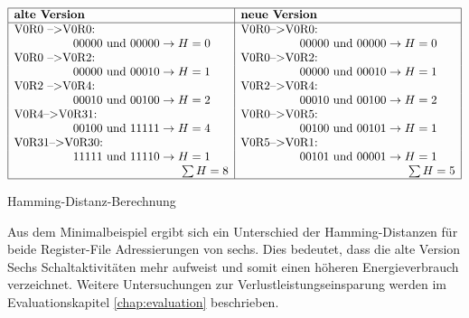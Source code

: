 \begin{table}[H]
	\centering
	$ \begin{array}{|l|l|}
	\hline
	\textbf{alte Version} & \textbf{neue Version} \\
	\hline
	\text{V0R0 -->V0R0: }&\text{V0R0-->V0R0: }\\ 
	\hspace{50pt} 00000 \text{ und } 00000 \rightarrow H= 0 &\hspace{50pt} 00000 \text{ und } 00000 \rightarrow H= 0\\
	\text{V0R0 -->V0R2: } &\text{V0R0-->V0R2: }\\
	\hspace{50pt} 00000 \text{ und } 00010 \rightarrow H= 1 &\hspace{50pt} 00000 \text{ und } 00010 \rightarrow H= 1 \\
	\text{V0R2 -->V0R4: } &\text{V0R2-->V0R4: }\\
	\hspace{50pt} 00010 \text{ und } 00100 \rightarrow H= 2 &\hspace{50pt} 00010 \text{ und } 00100 \rightarrow H= 2 \\
	\text{V0R4-->V0R31: } &\text{V0R0-->V0R5: }\\
	\hspace{50pt} 00100 \text{ und } 11111 \rightarrow H= 4 &\hspace{50pt} 00100 \text{ und } 00101 \rightarrow H= 1 \\
	\text{V0R31-->V0R30: } &\text{V0R5-->V0R1: }\\
	\hspace{50pt} 11111 \text{ und } 11110 \rightarrow H= 1 &\hspace{50pt} 00101 \text{ und } 00001 \rightarrow H= 1 \\
	\hspace{142pt} \sum H=8 &\hspace{142pt}\sum H=5 \\
	\hline
	\end{array} $
	\caption{Hamming-Distanz-Berechnung}
	\label{tab::hamming_distanz}
\end{table}
Aus dem Minimalbeispiel ergibt sich ein Unterschied der Hamming-Distanzen für beide Register-File Adressierungen von sechs. Dies bedeutet, dass die alte Version Sechs Schaltaktivitäten mehr aufweist und somit einen höheren Energieverbrauch verzeichnet. Weitere Untersuchungen zur Verlustleistungseinsparung werden im Evaluationskapitel \ref{chap:evaluation} beschrieben.





